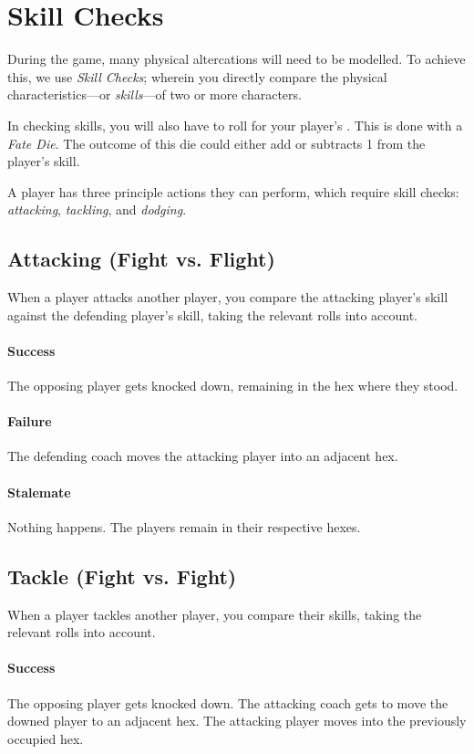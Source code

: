\section{Skill Checks}\label{skill-checks}
During the game, many physical altercations will need to be modelled.
To achieve this, we use \textit{Skill Checks}; wherein you directly compare the physical characteristics---or \textit{skills}---of two or more characters.

In checking skills, you will also have to roll for your player's \fate{}.
This is done with a \textit{Fate Die}.
The outcome of this die could either add or subtracts 1 from the player's skill.

A player has three principle actions they can perform, which require skill checks: \textit{attacking}, \textit{tackling}, and \textit{dodging}.

\subsection{Attacking (Fight vs. Flight)}
When a player attacks another player, you compare the attacking player's \fight{} skill against the defending player's \flight{} skill, taking the relevant \fate{} rolls into account.

\paragraph{Success}
The opposing player gets knocked down, remaining in the hex where they stood.
\paragraph{Failure}
The defending coach moves the attacking player into an adjacent hex.
\paragraph{Stalemate}
Nothing happens.
The players remain in their respective hexes.

\subsection{Tackle (Fight vs. Fight)}
When a player tackles another player, you compare their \fight{} skills, taking the relevant \fate{} rolls into account.

\paragraph{Success} 
The opposing player gets knocked down. 
The attacking coach gets to move the downed player to an adjacent hex.
The attacking player moves into the previously occupied hex.

